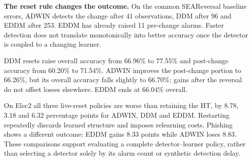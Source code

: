 \textbf{The reset rule changes the outcome.} On the common SEAReversal baseline errors, ADWIN detects the change after 41 observations, DDM after 96 and EDDM after 253. EDDM has already raised 11 pre-change alarms. Faster detection does not translate monotonically into better accuracy once the detector is coupled to a changing learner.

DDM resets raise overall accuracy from 66.96\% to 77.55\% and post-change accuracy from 60.20\% to 71.54\%. ADWIN improves the post-change portion to 66.26\%, but its overall accuracy falls slightly to 66.70\%; gains after the reversal do not offset losses elsewhere. EDDM ends at 66.04\% overall.

On Elec2 all three live-reset policies are worse than retaining the HT, by 8.78, 3.18 and 6.32 percentage points for ADWIN, DDM and EDDM. Restarting repeatedly discards learned structure and imposes relearning costs. Phishing shows a different outcome: EDDM gains 8.33 points while ADWIN loses 8.83. These comparisons support evaluating a complete detector--learner policy, rather than selecting a detector solely by its alarm count or synthetic detection delay.
